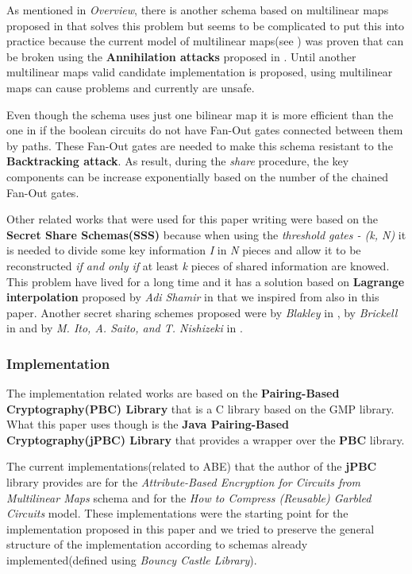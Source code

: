 \documentclass[12pt]{article}
\begin{document}
As mentioned in \textit{Overview}, there is another schema based on multilinear maps proposed in \cite{gghsw} that solves this problem but seems to be complicated to put this into practice because the current model of multilinear maps(see \cite{ggh}) was proven that can be broken using the \textbf{Annihilation attacks} proposed in \cite{msz}. Until another multilinear maps valid candidate implementation is proposed, using multilinear maps can cause problems and currently are unsafe.

Even though the \cite{fltccd} schema uses just one bilinear map it is more efficient than the one in \cite{gghsw} if the boolean circuits do not have Fan-Out gates connected between them by paths. These Fan-Out gates are needed to make this schema resistant to the \textbf{Backtracking attack}. As result, during the \textit{share} procedure, the key components can be increase exponentially based on the number of the chained Fan-Out gates.

Other related works that were used for this paper writing were based on the \textbf{Secret Share Schemas(SSS)} because when using the \textit{threshold gates - (k, N)} it is needed to divide some key information \textit{I} in \textit{N} pieces and allow it to be reconstructed \textit{if and only if} at least \textit{k} pieces of shared information are knowed. This problem have lived for a long time and it has a solution based on \textbf{Lagrange interpolation} proposed by \textit{Adi Shamir} in \cite{shamir} that we inspired from also in this paper. Another secret sharing schemes proposed were by \textit{Blakley} in \cite{blakley}, by \textit{Brickell} in \cite{brickell} and by \textit{M. Ito, A. Saito, and T. Nishizeki} in \cite{isn}.

\subsubsection{Implementation}

The implementation related works are based on the \textbf{Pairing-Based Cryptography(PBC) Library}\cite{pbc} that is a C library based on the GMP library\cite{gmp}. What this paper uses though is the \textbf{Java Pairing-Based Cryptography(jPBC) Library}\cite{jpbc} that provides a wrapper over the \textbf{PBC} library. 

The current implementations(related to ABE) that the author of the \textbf{jPBC} library provides are for the \textit{Attribute-Based Encryption for Circuits from Multilinear Maps}\cite{gghsw} schema and for the \textit{How to Compress (Reusable) Garbled Circuits}\cite{gghvv} model. These implementations were the starting point for the implementation proposed in this paper and we tried to preserve the general structure of the implementation according to schemas already implemented(defined using \textit{Bouncy Castle Library}\cite{bc}).
\end{document}
